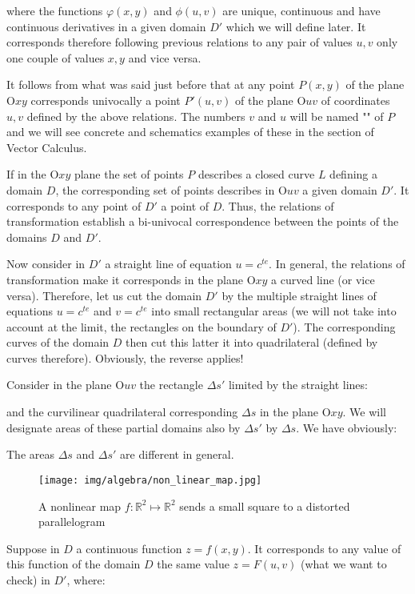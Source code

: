 	where the functions $\varphi (x,y)$ and $\phi(u,v)$ are unique, continuous and have continuous derivatives in a given domain $D'$ which we will define later. It corresponds therefore following previous relations to any pair of values $u, v$ only one couple of values $x, y$ and vice versa.
	
	It follows from what was said just before that at any point $P(x,y)$ of the plane $\text{O}xy$  corresponds univocally a point $P '(u, v)$ of the plane $\text{O}uv$ of coordinates $u, v$ defined by the above relations. The numbers $v$ and $u$ will be named "\label{curvilinear coordinates}" of $P$ and we will see concrete and schematics examples of these in the section of Vector Calculus.

	If in the $\text{O}xy$ plane the set of points $P$ describes a closed curve $L$ defining a domain $D$, the corresponding set of points describes in $\text{O}uv$ a given domain $D'$. It corresponds to any point of $D'$ a point of $D$. Thus, the relations of transformation establish a bi-univocal correspondence between the points of the domains $D$ and $D'$.
	
	Now consider in $D'$ a straight line of equation $u=c^{te}$. In general, the relations of transformation make it corresponds in the plane $\text{O}xy$ a curved line (or vice versa). Therefore, let us cut the domain $D'$ by the multiple straight lines of equations $u=c^{te}$ and $v=c^{te}$ into small rectangular areas (we will not take into account at the limit, the rectangles on the boundary of $D'$). The corresponding curves of the domain $D$ then cut this latter it into quadrilateral (defined by curves therefore). Obviously, the reverse applies!
	
	Consider in the plane $\text{O}uv$ the rectangle $\Delta s'$ limited by the straight lines:
	
	and the curvilinear quadrilateral corresponding $\Delta s$ in the plane $\text{O}xy$. We will designate areas of these partial domains also  by $\Delta s'$ by $\Delta s$. We have obviously:
	
	The areas $\Delta s$ and $\Delta s'$ are different in general.
	 \begin{figure}[H]
		\centering
		\texttt{[image: img/algebra/non\_linear\_map.jpg]}
		\caption{A nonlinear map $f : \mathbb{R}^2\mapsto \mathbb{R}^2$ sends a small square to a distorted parallelogram}
	\end{figure}
	Suppose in $D$ a continuous function $z=f(x,y)$. It corresponds to any value of this function of the domain $D$ the same value $z=F(u,v)$ (what we want to check) in $D'$, where:
	
